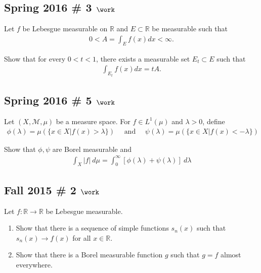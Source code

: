 \hypertarget{spring-2016-3-work}{%
\subsection{\texorpdfstring{Spring 2016 \# 3
\(\work\)}{Spring 2016 \# 3 \textbackslash work}}\label{spring-2016-3-work}}

Let \(f\) be Lebesgue measurable on \({\mathbb{R}}\) and
\(E \subset {\mathbb{R}}\) be measurable such that
\begin{align*}
0<A=\int_{E} f(x) d x<\infty.
\end{align*}

Show that for every \(0 < t < 1\), there exists a measurable set
\(E_t \subset E\) such that
\begin{align*}
\int_{E_{t}} f(x) d x=t A.
\end{align*}

\hypertarget{spring-2016-5-work}{%
\subsection{\texorpdfstring{Spring 2016 \# 5
\(\work\)}{Spring 2016 \# 5 \textbackslash work}}\label{spring-2016-5-work}}

Let \((X, \mathcal M, \mu)\) be a measure space. For \(f\in L^1(\mu)\)
and \(\lambda > 0\), define
\begin{align*}
\phi(\lambda)=\mu(\{x \in X | f(x)>\lambda\}) 
\quad \text { and } \quad 
\psi(\lambda)=\mu(\{x \in X | f(x)<-\lambda\})
\end{align*}

Show that \(\phi, \psi\) are Borel measurable and
\begin{align*}
\int_{X}|f| ~d \mu=\int_{0}^{\infty}[\phi(\lambda)+\psi(\lambda)] ~d \lambda
\end{align*}

\hypertarget{fall-2015-2-work}{%
\subsection{\texorpdfstring{Fall 2015 \# 2
\(\work\)}{Fall 2015 \# 2 \textbackslash work}}\label{fall-2015-2-work}}

Let \(f: {\mathbb{R}}\to {\mathbb{R}}\) be Lebesgue measurable.

\begin{enumerate}
\def\labelenumi{\arabic{enumi}.}
\tightlist
\item
  Show that there is a sequence of simple functions \(s_n(x)\) such that
  \(s_n(x) \to f(x)\) for all \(x\in {\mathbb{R}}\).
\item
  Show that there is a Borel measurable function \(g\) such that
  \(g = f\) almost everywhere.
\end{enumerate}

